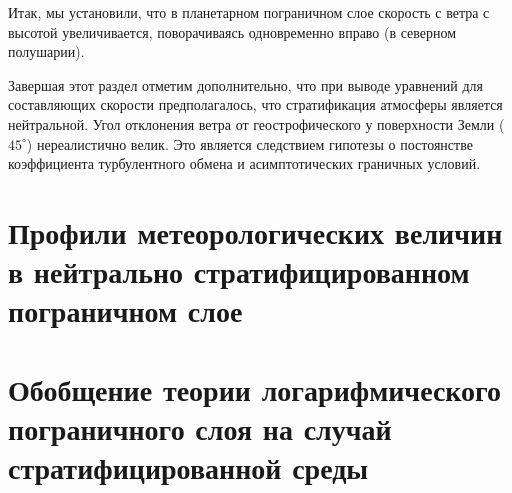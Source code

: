 Итак, мы установили, что в планетарном пограничном слое скорость с ветра с высотой увеличивается, поворачиваясь одновременно вправо (в северном полушарии).

Завершая этот раздел отметим дополнительно, что при выводе уравнений для составляющих скорости предполагалось, что стратификация атмосферы является нейтральной. Угол отклонения ветра от геострофического у поверхности Земли ($45^{\circ}$) нереалистично велик. Это является следствием гипотезы о постоянстве коэффициента турбулентного обмена и асимптотических граничных условий. 

\section{Профили метеорологических величин в 
нейтрально стратифицированном пограничном слое}

\section{Обобщение теории логарифмического пограничного слоя на случай стратифицированной среды}

